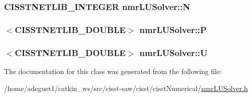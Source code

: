\hypertarget{classnmr_l_u_solver_ad757f79f286e11fa14ff4890acfc3ac0}{
\subsubsection[{N}]{\setlength{\rightskip}{0pt plus 5cm}C\-I\-S\-S\-T\-N\-E\-T\-L\-I\-B\-\_\-\-I\-N\-T\-E\-G\-E\-R nmr\-L\-U\-Solver\-::\-N\hspace{0.3cm}{\ttfamily [protected]}}}\label{classnmr_l_u_solver_ad757f79f286e11fa14ff4890acfc3ac0}
\hypertarget{classnmr_l_u_solver_a221f406c2d7cc55ed7f077a2e4c990cb}{
\subsubsection[{P}]{$<$C\-I\-S\-S\-T\-N\-E\-T\-L\-I\-B\-\_\-\-D\-O\-U\-B\-L\-E$>$ nmr\-L\-U\-Solver\-::\-P\hspace{0.3cm}{\ttfamily [protected]}}}\label{classnmr_l_u_solver_a221f406c2d7cc55ed7f077a2e4c990cb}
\hypertarget{classnmr_l_u_solver_a02868ccfffd41664e2883641de95650f}{
\subsubsection[{U}]{$<$C\-I\-S\-S\-T\-N\-E\-T\-L\-I\-B\-\_\-\-D\-O\-U\-B\-L\-E$>$ nmr\-L\-U\-Solver\-::\-U\hspace{0.3cm}{\ttfamily [protected]}}}\label{classnmr_l_u_solver_a02868ccfffd41664e2883641de95650f}


The documentation for this class was generated from the following file\-:\begin{DoxyCompactItemize}
\item 
/home/adeguet1/catkin\-\_\-ws/src/cisst-\/saw/cisst/cisst\-Numerical/\hyperlink{nmr_l_u_solver_8h}{nmr\-L\-U\-Solver.\-h}\end{DoxyCompactItemize}
